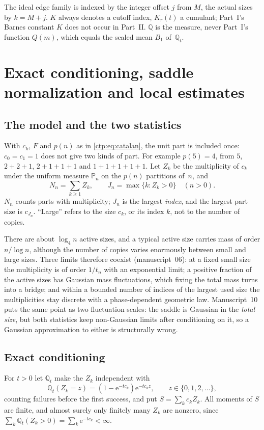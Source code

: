\documentclass[11pt,a4paper]{article}
\numberwithin{equation}{section}
\theoremstyle{definition}
\theoremstyle{remark}
\newcommand{\e}{\mathrm e}
\newcommand{\PP}{\mathbb P}
\newcommand{\Q}{\mathbb Q}
\begin{document}
The ideal edge family is indexed by the integer offset $j$ from $M$, the
actual sizes by $k=M+j$. $K$ always denotes a cutoff index, $K_r(t)$ a
cumulant; Part~I's Barnes constant $K$ does not occur in Part~II.
$\Q$ is the measure, never Part~I's function $Q(m)$, which equals the
scaled mean $B_1$ of~$\Q_t$.

\section{Exact conditioning, saddle normalization and local estimates}
\label{ctp:cl:sec:setup}

\subsection{The model and the two statistics}
With $c_k$, $F$ and $p(n)$ as in \eqref{ctp:eq:catalan}, the unit part is
included once: $c_0=c_1=1$ does not give two kinds of part. For example
$p(5)=4$, from $5$, $2+2+1$, $2+1+1+1$ and $1+1+1+1+1$. Let $Z_k$ be the
multiplicity of $c_k$ under the uniform measure $\PP_n$ on the $p(n)$
partitions of~$n$, and
\begin{equation}\label{ctp:cl:eq:statistics}
 N_n=\sum_{k\ge1}Z_k,\qquad J_n=\max\{k:Z_k>0\}\quad(n>0).
\end{equation}
$N_n$ counts parts with multiplicity; $J_n$ is the largest \emph{index},
and the largest part size is $c_{J_n}$. ``Large'' refers to the size $c_k$,
or its index $k$, not to the number of copies.

There are about $\log_4n$ active sizes, and a typical active size carries
mass of order $n/\log n$, although the number of copies varies enormously
between small and large sizes. Three limits therefore coexist
(manuscript~06): at a fixed small size the multiplicity is of order $1/t_n$
with an exponential limit; a positive fraction of the active sizes has
Gaussian mass fluctuations, which fixing the total mass turns into a
bridge; and within a bounded number of indices of the largest used size
the multiplicities stay discrete with a phase-dependent geometric law.
Manuscript~10 puts the same point as two fluctuation scales: the saddle is
Gaussian in the \emph{total size}, but both statistics keep non-Gaussian
limits after conditioning on it, so a Gaussian approximation to either is
structurally wrong.

\subsection{Exact conditioning}
For $t>0$ let $\Q_t$ make the $Z_k$ independent with
\begin{equation}\label{ctp:cl:eq:geom}
 \Q_t(Z_k=z)=(1-\e^{-tc_k})\e^{-tc_kz},\qquad z\in\{0,1,2,\ldots\},
\end{equation}
counting failures before the first success, and put
$S=\sum_kc_kZ_k$. All moments of $S$ are finite, and almost surely only
finitely many $Z_k$ are nonzero, since $\sum_k\Q_t(Z_k>0)=\sum_k\e^{-tc_k}<\infty$.
\end{document}
